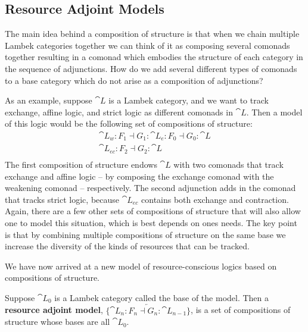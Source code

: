 \subsection{Resource Adjoint Models}
\label{subsec:resource_adjoint_models}

The main idea behind a composition of structure is that when we
chain multiple Lambek categories together we can think of it as
composing several comonads together resulting in a comonad which
embodies the structure of each category in the sequence of
adjunctions.  How do we add several different types of
comonads to a base category which do not arise as a composition of
adjunctions?

As an example, suppose $\cat{L}$ is a Lambek category, and we want to
track exchange, affine logic, and strict logic as different comonads
in $\cat{L}$.  Then a model of this logic would be the following set
of compositions of structure:
\[
\begin{array}{lll}
  \cat{L}_w : F_1 \dashv G_1 : \cat{L}_e : F_0 \dashv G_0 : \cat{L}\\
  \cat{L}_{ec} : F_2 \dashv G_2 : \cat{L}\\
\end{array}
\]
The first composition of structure endows $\cat{L}$ with two comonads
that track exchange and affine logic -- by composing the exchange
comonad with the weakening comonad -- respectively.  The second
adjunction adds in the comonad that tracks strict logic, because
$\cat{L}_{ec}$ contains both exchange and contraction.  Again, there
are a few other sets of compositions of structure that will also allow
one to model this situation, which is best depends on ones needs.  The
key point is that by combining multiple compositions of structure on
the same base we increase the diversity of the kinds of resources that
can be tracked.

We have now arrived at a new model of resource-conscious logics based
on compositions of structure.
\begin{definition}
  \label{def:resource-adjoint-model}
  Suppose $\cat{L}_0$ is a Lambek category called the base of the
  model.  Then a \textbf{resource adjoint model},
  $\{\overleftarrow{\cat{L}_n : F_n \dashv G_n : \cat{L}_{n-1}}\}$,
  is a set of compositions of structure whose bases are all $\cat{L}_0$.
\end{definition}



